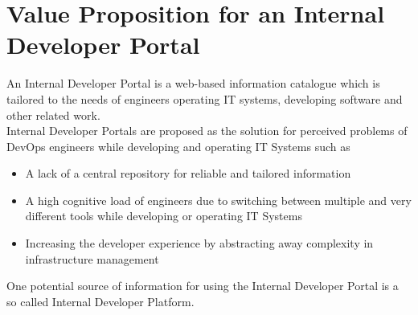 \documentclass[a4paper,12pt]{article}
\begin{document}
    \section{Value Proposition for an Internal Developer Portal}
    \label{sec:vp}
    An Internal Developer Portal is a web-based information catalogue which is tailored to the needs of
    engineers operating IT systems, developing software and other related work.\\
    Internal Developer Portals are proposed as the solution for perceived problems\parencite{backstagestory} of DevOps
    engineers while developing and operating IT Systems such as
    \begin{itemize}
        \item A lack of a central repository for reliable and tailored information
        \item A high cognitive load of engineers due to switching between multiple and very different tools while developing or operating IT Systems
        \item Increasing the developer experience by abstracting away complexity in infrastructure management
    \end{itemize}
    One potential source of information for using the Internal Developer Portal is a so called Internal Developer Platform.
\end{document}
